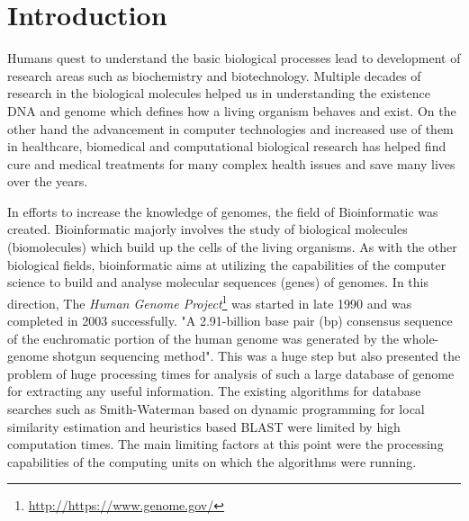 \documentclass[12pt,twoside]{article}
\begin{document}
\section{Introduction}
\label{sec:introduction}

Humans quest to understand the basic biological processes lead to development of research areas such as
biochemistry and biotechnology. Multiple decades of research in the biological molecules helped us in
understanding the existence DNA and genome which defines how a living organism behaves and exist.
On the other hand the advancement in computer technologies and increased use of them in healthcare, biomedical
and computational biological research has helped find cure and medical treatments for many complex health
issues and save many lives over the years.

In efforts to increase the knowledge of genomes, the field of Bioinformatic was created. Bioinformatic majorly involves
the study of biological molecules (biomolecules) which build up the cells of the living organisms. As with the other biological fields,
bioinformatic aims at utilizing the capabilities of the computer science to build and analyse molecular sequences (genes) of genomes.
In this direction, The \emph{Human Genome Project}\footnote{\url{http://https://www.genome.gov/}}  was started in late 1990 and was
completed in 2003 successfully. "A 2.91-billion base pair (bp) consensus sequence of the euchromatic portion of
the human genome was generated by the whole-genome shotgun sequencing method"\cite{venter_sequence_2001}. This was a huge
step but also presented the problem of huge processing times for analysis of such a large database of genome for extracting any
useful information. The existing algorithms for database searches such as Smith-Waterman \cite{smith_identification_1981} based
on dynamic programming for local similarity estimation and heuristics based BLAST \cite{altschul_basic_1990} were limited by
high computation times. The main limiting factors at this point were the processing capabilities of the computing units
on which the algorithms were running.
\end{document}
